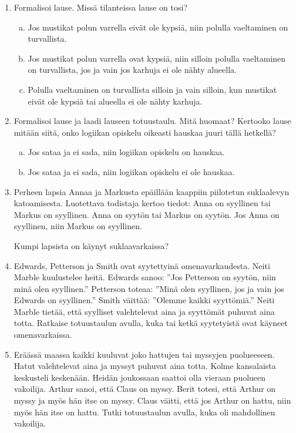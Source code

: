 \begin{enumerate}
\newpage

\item Formalisoi lause. Missä tilanteissa lause on tosi?
\begin{enumerate}[a)]
\item
Jos mustikat polun varrella eivät ole kypsiä, niin polulla vaeltaminen on turvallista.
\item Jos mustikat polun varrella ovat kypsiä, niin silloin polulla vaeltaminen on turvallista, jos ja vain jos karhuja ei ole nähty alueella. 
\item Polulla vaeltaminen on turvallista silloin ja vain silloin, kun mustikat eivät ole kypsiä tai alueella ei ole nähty karhuja.
\end{enumerate}

\item Formalisoi lause ja laadi lauseen totuustaulu. Mitä huomaat? Kertooko lause mitään siitä, onko logiikan opiskelu oikeasti hauskaa juuri tällä hetkellä? 
\begin{enumerate}[a)]
\item Jos sataa ja ei sada, niin logiikan opiskelu on hauskaa.
\item Jos sataa ja ei sada, niin logiikan opiskelu ei ole hauskaa.
\end{enumerate}

\item Perheen lapsia Annaa ja Markusta epäillään kaappiin piilotetun suklaalevyn katoamisesta. Luotettava todistaja kertoo tiedot:
Anna on syyllinen tai Markus on syyllinen.
Anna on syytön tai Markus on syytön. 
Jos Anna on syyllinen, niin Markus on syyllinen.

Kumpi lapsista on käynyt suklaavarkaissa?

\item Edwards, Petterson ja Smith ovat syytettyinä omenavarkaudesta. Neiti Marble kuulustelee heitä. Edwards sanoo: ''Jos Petterson on syytön, niin minä olen syyllinen.'' Petterson toteaa: ''Minä olen syyllinen, jos ja vain jos Edwards on syyllinen.'' Smith väittää: ''Olemme kaikki syyttömiä.'' Neiti Marble tietää, että syylliset valehtelevat aina ja syyttömät puhuvat aina totta. Ratkaise totuustaulun avulla, kuka tai ketkä syytetyistä ovat käyneet omenavarkaissa.

\item Eräässä maassa kaikki kuuluvat joko hattujen tai myssyjen puolueeseen. Hatut valehtelevat aina ja myssyt puhuvat aina totta. Kolme kansalaista keskusteli keskenään. Heidän joukossaan saattoi olla vieraan puolueen vakoilija. Arthur sanoi, että Claus on myssy. Berit totesi, että Arthur on myssy ja myös hän itse on myssy. Claus väitti, että jos Arthur on hattu, niin myös hän itse on hattu. Tutki totuustaulun avulla, kuka oli mahdollinen vakoilija.


\end{enumerate}
